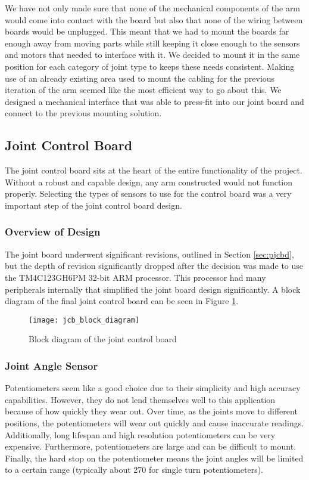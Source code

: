 \noindent We have not only made sure that none of the mechanical components of the arm would come into contact with the board but also that none of the wiring between boards would be unplugged. This meant that we had to mount the boards far enough away from moving parts while still keeping it close enough to the sensors and motors that needed to interface with it. We decided to mount it in the same position for each category of joint type to keeps these needs consistent. Making use of an already existing area used to mount the cabling for the previous iteration of the arm seemed like the most efficient way to go about this. We designed a mechanical interface that was able to press-fit into our joint board and connect to the previous mounting solution.


\subsection{Joint Control Board}
The joint control board sits at the heart of the entire functionality of the project. Without a robust and capable design, any arm constructed would not function properly. Selecting the types of sensors to use for the control board was a very important step of the joint control board design. %

\subsubsection{Overview of Design}
The joint board underwent significant revisions, outlined in Section \ref{sec:pjcbd}, but the depth of revision significantly dropped after the decision was made to use the TM4C123GH6PM 32-bit ARM processor. This processor had many peripherals internally that simplified the joint board design significantly. A block diagram of the final joint control board can be seen in Figure \ref{fig:jcb_block_diagram}.

\begin{figure}[H]
	\centering
	\texttt{[image: jcb\_block\_diagram]}
	\caption{Block diagram of the joint control board}
	\label{fig:jcb_block_diagram}
\end{figure}

\subsubsection{Joint Angle Sensor}
\label{sec:jas}
Potentiometers seem like a good choice due to their simplicity and high accuracy capabilities. However, they do not lend themselves well to this application because of how quickly they wear out. Over time, as the joints move to different positions, the potentiometers will wear out quickly and cause inaccurate readings. Additionally, long lifespan and high resolution potentiometers can be very expensive. Furthermore, potentiometers are large and can be difficult to mount. Finally, the hard stop on the potentiometer means the joint angles will be limited to a certain range (typically about 270 \textdegree for single turn potentiometers).

